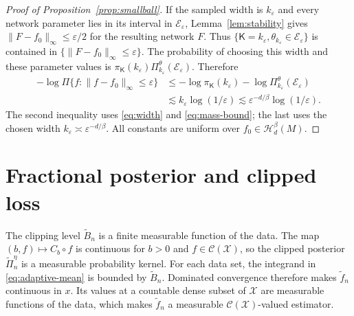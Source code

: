 \documentclass[11pt,a4paper]{article}
\theoremstyle{remark}
\newcommand{\Xcal}{\mathcal X}
\newcommand{\Hcal}{\mathcal H}
\newcommand{\Ccal}{\mathcal C}
\newcommand{\norm}[1]{\lVert#1\rVert}
\begin{document}
\begingroup
\begin{proof}[Proof of Proposition~\ref{prop:smallball}]
If the sampled width is $k_\varepsilon$ and every network parameter
lies in its interval in $\mathcal E_\varepsilon$, Lemma~\ref{lem:stability}
gives $\norm{F-f_0}_\infty\leq\varepsilon/2$ for the resulting
network $F$. Thus
$\{\mathsf K=k_\varepsilon,\theta_{k_\varepsilon}\in\mathcal E_\varepsilon\}$
is contained in $\{\norm{F-f_0}_\infty\leq\varepsilon\}$.
The probability of choosing this width and these parameter values is
$\pi_{\mathsf K}(k_\varepsilon)
\Pi_{k_\varepsilon}^{\theta}(\mathcal E_\varepsilon)$. Therefore
\begin{align*}
-\log\Pi\{f:\norm{f-f_0}_\infty\leq\varepsilon\}
&\leq-\log\pi_{\mathsf K}(k_\varepsilon)
-\log\Pi_{k_\varepsilon}^{\theta}(\mathcal E_\varepsilon)\\
&\lesssim k_\varepsilon\log(1/\varepsilon)
\lesssim\varepsilon^{-d/\beta}\log(1/\varepsilon).
\end{align*}
The second inequality uses \eqref{eq:width} and
\eqref{eq:mass-bound}; the last uses the chosen width
$k_\varepsilon\asymp\varepsilon^{-d/\beta}$.
All constants are uniform over $f_0\in\Hcal_d^\beta(M)$.
\end{proof}
\endgroup

\section{Fractional posterior and clipped loss}\label{app:posterior}

{The clipping level $\widetilde B_n$ is a finite measurable
function of the data. The map $(b,f)\mapsto C_b\circ f$ is continuous
for $b>0$ and $f\in\Ccal(\Xcal)$, so the clipped posterior
$\widetilde\Pi_n^\eta$ is a measurable probability kernel.
For each data set, the integrand in \eqref{eq:adaptive-mean} is
bounded by $\widetilde B_n$. Dominated convergence therefore makes
$\widetilde f_n$ continuous in $x$. Its values at a countable dense
subset of $\Xcal$ are measurable functions of the data, which
makes $\widetilde f_n$ a measurable $\Ccal(\Xcal)$-valued estimator.}
\end{document}
